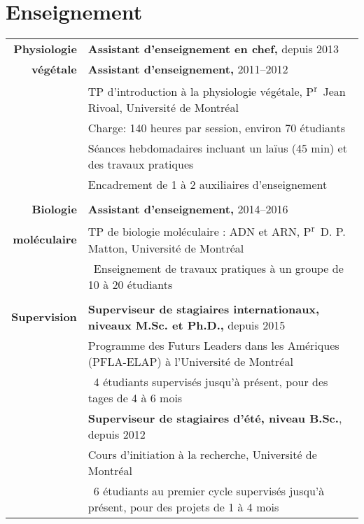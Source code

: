 \documentclass[letterpaper,10pt]{article}
\begin{document}
\bigskip
\bigskip

\section{Enseignement}
\begin{tabular}{r|p{14cm}}

\textbf{Physiologie}
& \textbf{Assistant d’enseignement en chef,} depuis 2013 \\
\textbf{végétale}
& \textbf{Assistant d’enseignement,} 2011--2012 \\
& TP d’introduction à la physiologie végétale, P\textsuperscript{r}~Jean Rivoal, Université de Montréal
  \vspace{1mm} \\
& \textbullet{} Charge: 140 heures par session, environ 70 étudiants \\
& \textbullet{} Séances hebdomadaires incluant un laïus (45 min) et des travaux
  pratiques \\
& \textbullet{} Encadrement de 1 à 2 auxiliaires d'enseignement \\

\multicolumn{2}{c}{} \\

\textbf{Biologie}
& \textbf{Assistant d’enseignement,} 2014--2016 \\
\textbf{moléculaire}
& TP de biologie moléculaire : ADN et ARN, P\textsuperscript{r}~D. P. Matton,
  Université de Montréal
  \vspace{1mm} \\
& \textbullet{}~Enseignement de travaux pratiques à un groupe de 10 à 20
  étudiants \\

\multicolumn{2}{c}{} \\

\textbf{Supervision}
& \textbf{Superviseur de stagiaires internationaux,
  niveaux M.Sc. et Ph.D.,} depuis 2015 \\
& Programme des Futurs Leaders dans les Amériques (PFLA-ELAP)
  à l’Université de Montréal
  \vspace{1mm} \\
& \textbullet{}~4 étudiants supervisés jusqu’à présent, pour des tages de 4 à 6
  mois
\vspace{2.5mm} \\

& \textbf{Superviseur de  stagiaires d’été, niveau B.Sc.}, depuis 2012 \\
& Cours d’initiation à la recherche, Université de Montréal
  \vspace{1mm} \\
& \textbullet{}~6 étudiants au premier cycle supervisés jusqu’à présent, pour
  des projets de 1 à 4 mois \\

\end{tabular}
\end{document}

